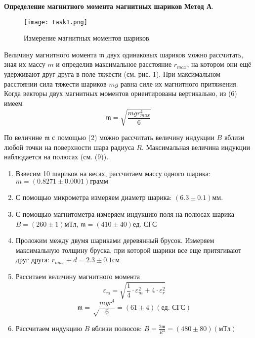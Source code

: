 \documentclass[12pt,a4paper]{article}
\begin{document}
\textbf{Определение магнитного момента магнитных шариков}
\textbf{Метод А}. 
\begin{figure}[h!]
	\begin{center}
		\texttt{[image: task1.png]}
		\caption{Измерение магнитных моментов шариков}
		\label{fig:facility}
	\end{center}
\end{figure}
Величину магнитного момента $\mathfrak{m}$ двух одинаковых шариков можно рассчитать, зная их массу $m$ и определив максимальное расстояние $r_{max}$, на котором они ещё
удерживают друг друга в поле тяжести (см. рис. 1). При максимальном расстоянии сила тяжести шариков $mg$ равна силе их магнитного притяжения. Когда векторы 
двух магнитных моментов ориентированы вертикально, из (6) имеем
\begin{equation}
    \mathfrak{m} = \sqrt{\frac{mgr_{max}^4}{6}}
\end{equation}

По величине $\mathfrak{m}$ с помощью (2) можно рассчитать величину индукции $B$ вблизи любой точки на поверхности шара радиуса $R$. Максимальная величина 
индукции наблюдается на полюсах (см. (9)).
\begin{enumerate} 
    \item Взвесим 10 шариков на весах, рассчитаем массу одного шарика: $m = (0.8271 \pm 0.0001)\text{грамм}$
    \item С помощью микрометра измеряем диаметр шарика: $(6.3 \pm 0.1) \text{мм}$.
    \item С помощью магнитометра измеряем индукцию поля на полюсах шарика $B = (260 \pm 1) \text{мТл}$, $\mathfrak{m} = (410 \pm 40) \text{ед. СГС} $
    \item Проложим между двумя шариками деревянный брусок. Измеряем максимальную толщину бруска, при которой шарики все еще притягивают друг друга:
$r_{max} + d = 2.3 \pm 0.1 \text{см}$  
    \item Расситаем величину магнитного момента 
    \begin{equation}
        \varepsilon_{\mathfrak{m}} = \sqrt{\frac{1}{4} \cdot {\varepsilon_{m}^2} + 4 \cdot {\varepsilon_{r}^2}}
    \end{equation}
    \begin{equation}
        \mathfrak{m} = \sqrt\frac{mgr^4}{6} = (61 \pm 4) (\text{ед. СГС})
    \end{equation} 

    \item Рассчитаем индукцию $B$ вблизи полюсов: $B = \frac{2\mathfrak{m}}{R^3} = (480 \pm 80) (\text{мТл})$
\end{enumerate}
\end{document}
